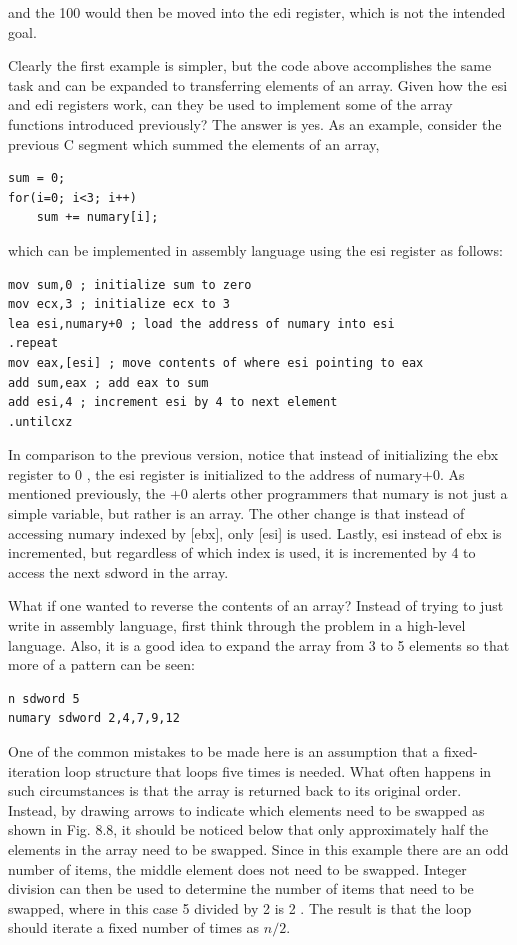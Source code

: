 \documentclass[10pt]{article}
\begin{document}
and the 100 would then be moved into the edi register, which is not the intended goal.

Clearly the first example is simpler, but the code above accomplishes the same task and can be expanded to transferring elements of an array. Given how the esi and edi registers work, can they be used to implement some of the array functions introduced previously? The answer is yes. As an example, consider the previous C segment which summed the elements of an array,

\begin{verbatim}
sum = 0;
for(i=0; i<3; i++)
    sum += numary[i];
\end{verbatim}

which can be implemented in assembly language using the esi register as follows:

\begin{verbatim}
mov sum,0 ; initialize sum to zero
mov ecx,3 ; initialize ecx to 3
lea esi,numary+0 ; load the address of numary into esi
.repeat
mov eax,[esi] ; move contents of where esi pointing to eax
add sum,eax ; add eax to sum
add esi,4 ; increment esi by 4 to next element
.untilcxz
\end{verbatim}

In comparison to the previous version, notice that instead of initializing the ebx register to 0 , the esi register is initialized to the address of numary+0. As mentioned previously, the +0 alerts other programmers that numary is not just a simple variable, but rather is an array. The other change is that instead of accessing numary indexed by [ebx], only [esi] is used. Lastly, esi instead of ebx is incremented, but regardless of which index is used, it is incremented by 4 to access the next sdword in the array.

What if one wanted to reverse the contents of an array? Instead of trying to just write in assembly language, first think through the problem in a high-level language. Also, it is a good idea to expand the array from 3 to 5 elements so that more of a pattern can be seen:

\begin{verbatim}
n sdword 5
numary sdword 2,4,7,9,12
\end{verbatim}

One of the common mistakes to be made here is an assumption that a fixed-iteration loop structure that loops five times is needed. What often happens in such circumstances is that the array is returned back to its original order. Instead, by drawing arrows to indicate which elements need to be swapped as shown in Fig. 8.8, it should be noticed below that only approximately half the elements in the array need to be swapped. Since in this example there are an odd number of items, the middle element does not need to be swapped. Integer division can then be used to determine the number of items that need to be swapped, where in this case 5 divided by 2 is 2 . The result is that the loop should iterate a fixed number of times as $n / 2$.
\end{document}
